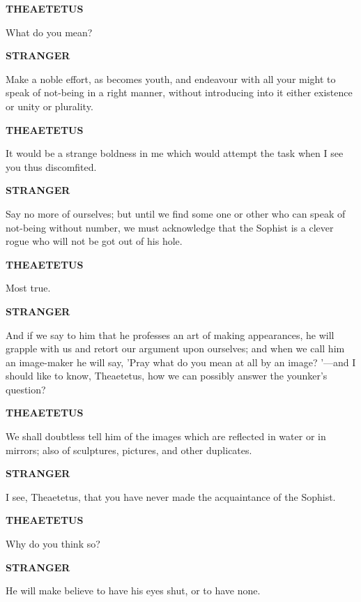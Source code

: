 \documentclass[11pt,letter]{article}
\begin{document}
\par \textbf{THEAETETUS}
\par   What do you mean?

\par \textbf{STRANGER}
\par   Make a noble effort, as becomes youth, and endeavour with all your might to speak of not-being in a right manner, without introducing into it either existence or unity or plurality.

\par \textbf{THEAETETUS}
\par   It would be a strange boldness in me which would attempt the task when I see you thus discomfited.

\par \textbf{STRANGER}
\par   Say no more of ourselves; but until we find some one or other who can speak of not-being without number, we must acknowledge that the Sophist is a clever rogue who will not be got out of his hole.

\par \textbf{THEAETETUS}
\par   Most true.

\par \textbf{STRANGER}
\par   And if we say to him that he professes an art of making appearances, he will grapple with us and retort our argument upon ourselves; and when we call him an image-maker he will say, 'Pray what do you mean at all by an image? '—and I should like to know, Theaetetus, how we can possibly answer the younker's question?

\par \textbf{THEAETETUS}
\par   We shall doubtless tell him of the images which are reflected in water or in mirrors; also of sculptures, pictures, and other duplicates.

\par \textbf{STRANGER}
\par   I see, Theaetetus, that you have never made the acquaintance of the Sophist.

\par \textbf{THEAETETUS}
\par   Why do you think so?

\par \textbf{STRANGER}
\par   He will make believe to have his eyes shut, or to have none.
\end{document}
